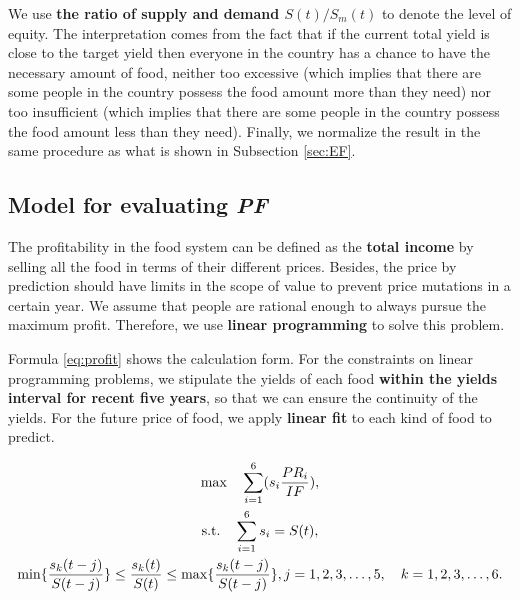 \documentclass[12pt]{article}
\begin{document}
We use \textbf{the ratio of supply and demand $S(t)/S_m(t)$} to denote the level of equity. The interpretation comes from the fact that if the current total yield is close to the target yield then everyone in the country has a chance to have the necessary amount of food, neither too excessive (which implies that there are some people in the country possess the food amount more than they need) nor too insufficient (which implies that there are some people in the country possess the food amount less than they need). Finally, we normalize the result in the same procedure as what is shown in Subsection \ref{sec:EF}.


\subsection{Model for evaluating \textit{PF}} \label{sec:pf}

The profitability in the food system can be defined as the \textbf{total income} by selling all the food in terms of their different prices. Besides, the price by prediction should have limits in the scope of value to prevent price mutations in a certain year. We assume that people are rational enough to always pursue the maximum profit. Therefore, we use \textbf{linear programming} to solve this problem. 

Formula \eqref{eq:profit} shows the calculation form. For the constraints on linear programming problems, we stipulate the yields of each food \textbf{within the yields interval for recent five years}, so that we can ensure the continuity of the yields. For the future price of food, we apply \textbf{linear fit} to each kind of food to predict.


\begin{gather}
% 
\max \quad  \sum_{i=1}^{6} (s_i \frac{PR_i}{IF}), \notag\\
\mbox{s.t.} \quad 
\sum_{i=1}^{6} s_i =S(t),\label{eq:profit} \\
\min \{ \frac{s_k(t-j)}{S(t-j)} \} \leq \frac{s_k(t)}{S(t)} \leq \max \{ \frac{s_k(t-j)}{S(t-j)} \}, j=1,2,3,\ldots,5, \quad k = 1,2,3,\ldots,6. \notag
\end{gather}
\end{document}
